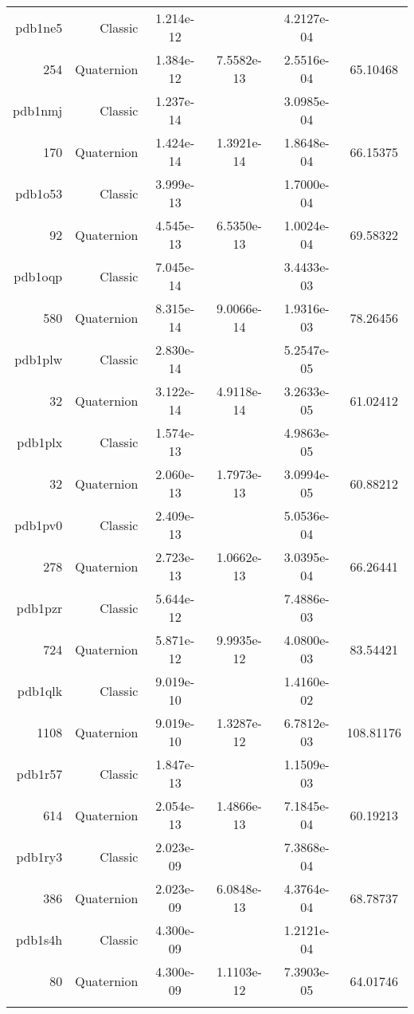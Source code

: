 \begin{xltabular}{\textwidth}{r|rS[table-format=1.3e+2]S[table-format=1.4e+2]S[table-format=1.4e+2]S[table-format=-1.5]}
pdb1ne5 & Classic & 1.214e-12 &  & 4.2127e-04 & \\
254 & Quaternion & 1.384e-12 & 7.5582e-13 & 2.5516e-04 & 65.10468\\  \addlinespace
pdb1nmj & Classic & 1.237e-14 &  & 3.0985e-04 & \\
170 & Quaternion & 1.424e-14 & 1.3921e-14 & 1.8648e-04 & 66.15375\\  \addlinespace
pdb1o53 & Classic & 3.999e-13 &  & 1.7000e-04 & \\
92 & Quaternion & 4.545e-13 & 6.5350e-13 & 1.0024e-04 & 69.58322\\  \addlinespace
pdb1oqp & Classic & 7.045e-14 &  & 3.4433e-03 & \\
580 & Quaternion & 8.315e-14 & 9.0066e-14 & 1.9316e-03 & 78.26456\\  \addlinespace
pdb1plw & Classic & 2.830e-14 &  & 5.2547e-05 & \\
32 & Quaternion & 3.122e-14 & 4.9118e-14 & 3.2633e-05 & 61.02412\\  \addlinespace
pdb1plx & Classic & 1.574e-13 &  & 4.9863e-05 & \\
32 & Quaternion & 2.060e-13 & 1.7973e-13 & 3.0994e-05 & 60.88212\\  \addlinespace
pdb1pv0 & Classic & 2.409e-13 &  & 5.0536e-04 & \\
278 & Quaternion & 2.723e-13 & 1.0662e-13 & 3.0395e-04 & 66.26441\\  \addlinespace
pdb1pzr & Classic & 5.644e-12 &  & 7.4886e-03 & \\
724 & Quaternion & 5.871e-12 & 9.9935e-12 & 4.0800e-03 & 83.54421\\  \addlinespace
pdb1qlk & Classic & 9.019e-10 &  & 1.4160e-02 & \\
1108 & Quaternion & 9.019e-10 & 1.3287e-12 & 6.7812e-03 & 108.81176\\  \addlinespace
pdb1r57 & Classic & 1.847e-13 &  & 1.1509e-03 & \\
614 & Quaternion & 2.054e-13 & 1.4866e-13 & 7.1845e-04 & 60.19213\\  \addlinespace
pdb1ry3 & Classic & 2.023e-09 &  & 7.3868e-04 & \\
386 & Quaternion & 2.023e-09 & 6.0848e-13 & 4.3764e-04 & 68.78737\\  \addlinespace
pdb1s4h & Classic & 4.300e-09 &  & 1.2121e-04 & \\
80 & Quaternion & 4.300e-09 & 1.1103e-12 & 7.3903e-05 & 64.01746\\  \addlinespace

\end{xltabular}
